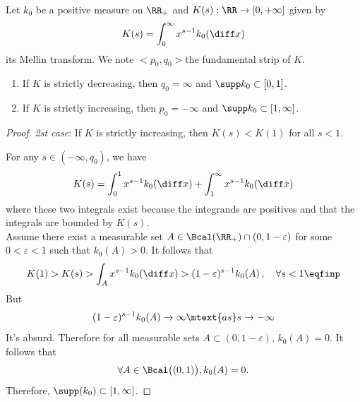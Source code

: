 \begin{lemma}Let $k_0$ be a positive measure on $\RR_+$ and $K(s):\RR \to [0,+\infty]$ given by $$K(s)=\int_0^\infty x^{s-1}k_0(\diff x)$$ its Mellin transform. We note $<p_0,q_0>$the fundamental strip of $K$.
\begin{enumerate}
    \item If $K$ is strictly decreasing, then $q_0 = \infty$ and  $\supp k_0 \subset [0,1]$.
    \item If $K$ is strictly increasing, then $p_0 = -\infty$ and $\supp k_0 \subset [1, \infty]$.
\end{enumerate}
\end{lemma}
\begin{proof}
\textit{2st case}: If $K$ is strictly increasing, then $K(s)<K(1)$ for all $s < 1$.


For any $s \in (-\infty, q_0)$, we have
\begin{align*}
    K(s) = \int_0^1 x^{s-1} k_0(\diff x) + \int_1^\infty x^{s-1} k_0(\diff x)
\end{align*}
where these two integrals exist because the integrands are positives and that the integrals are bounded by $K(s)$. \\

Assume there exist a measurable set $A \in \Bcal(\RR_+) \cap (0,1-\varepsilon)$ for some $0 < \varepsilon < 1$ such that $k_0(A) > 0$.  It follows that 
\begin{align*}
   K(1) > K(s) > \int_A x^{s-1} k_0(\diff x)
   > (1-\varepsilon)^{s-1} k_0(A)
   \,,\quad \forall s < 1
   \eqfinp
\end{align*}
But $$(1-\varepsilon)^{s-1} k_0(A) \to \infty \mtext{as} s \to -\infty$$
It's absurd. Therefore for all measurable sets $A \subset (0,1-\varepsilon)$, $k_0(A) = 0$. It follows that  
$$\forall A \in \Bcal\big((0,1)\big), k_0(A) = 0.$$
Therefore, $\supp(k_0) \subset [1, \infty]$.
\end{proof}

